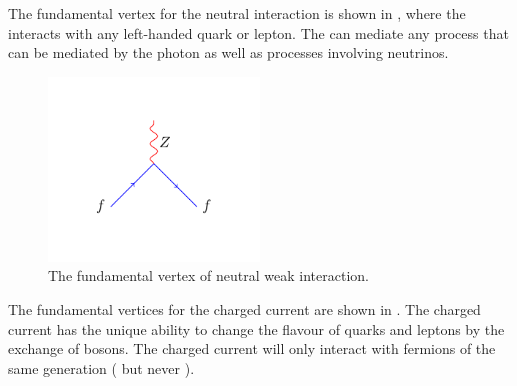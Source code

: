 The fundamental vertex for the neutral interaction is shown in
, where the \PZ interacts with any left-handed quark or lepton.
The \PZ can mediate any process that can be mediated by the photon as well as
processes involving neutrinos.
\begin{figure}[htbp]
  \centering
  \includegraphics[width=0.5\textwidth]{weak_neut_process}
  \caption{The fundamental vertex of neutral weak interaction.\label{fig:neutral}}
\end{figure}
The fundamental vertices for the charged current are shown in
. The charged current has the unique ability to change the
flavour of quarks and leptons by the exchange of \PW bosons. The charged current
will only interact with fermions of the same generation
(\HepProcess{\Pelectron\to\Pnue} but never
\HepProcess{\Pelectron\to\Pnum}).

